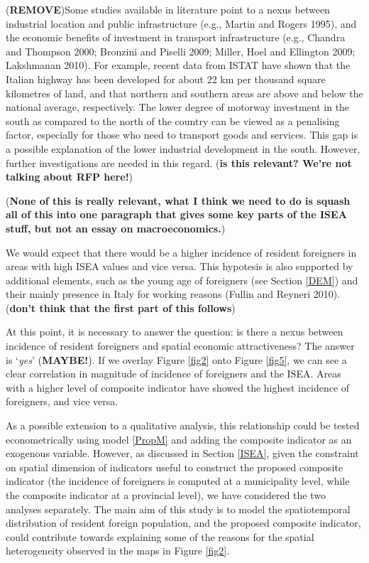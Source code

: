 \documentclass[10pt]{article}
\theoremstyle{definition}
\theoremstyle{plain}
\begin{document}
(\textbf{REMOVE})Some studies available in literature point to a nexus between industrial location and public infrastructure (e.g., Martin and Rogers 1995), and the economic benefits of investment in transport infrastructure (e.g., Chandra and Thompson 2000; Bronzini and Piselli 2009; Miller, Hoel and Ellington 2009; Lakshmanan 2010). For example, recent data from ISTAT have shown that the Italian highway has been developed for about 22 km per thousand square kilometres of land, and that northern and southern areas are above and below the national average, respectively. The lower degree of motorway investment in the south as compared to the north of the country can be viewed as a penalising factor, especially for those who need to transport goods and services. This gap is a possible explanation of the lower industrial development in the south. However, further investigations are needed in this regard. (\textbf{is this relevant? We're not talking about RFP here!})

(\textbf{None of this is really relevant, what I think we need to do is squash all of this into one paragraph that gives some key parts of the ISEA stuff, but not an essay on macroeconomics.})

We would expect that there would be a higher incidence of resident foreigners in areas with high ISEA values and vice versa. This hypotesis is also supported by additional elements, such as the young age of foreigners (see Section \ref{DEM}) and their mainly presence in Italy for working reasons (Fullin and Reyneri 2010). (\textbf{don't think that the first part of this follows})

At this point, it is necessary to answer the question: is there a nexus between incidence of resident foreigners and spatial economic attractiveness? The answer is `\textsl{yes}' (\textbf{MAYBE!}). If we overlay Figure \ref{fig2} onto Figure \ref{fig5}, we can see a clear correlation in magnitude of incidence of foreigners and the ISEA. Areas with a higher level of composite indicator have showed the highest incidence of foreigners, and vice versa.

As a possible extension to a qualitative analysis, this relationship could be tested econometrically using model \ref{PropM} and adding the composite indicator as an exogenous variable. However, as discussed in Section \ref{ISEA}, given the constraint on spatial dimension of indicators useful to construct the proposed composite indicator (the incidence of foreigners is computed at a municipality level, while the composite indicator at a provincial level), we have considered the two analyses separately. The main aim of this study is to model the spatiotemporal distribution of resident foreign population, and the proposed composite indicator, could contribute towards explaining some of the reasons for the spatial heterogeneity observed in the maps in Figure \ref{fig2}.
\end{document}
